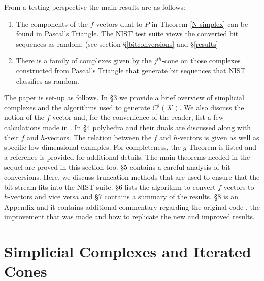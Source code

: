\documentclass[oneside,12pt]{amsart}
\theoremstyle{definition}
\numberwithin{equation}{section}
\begin{document}
From a testing perspective the main results are as follows: %

\begin{enumerate}
  \item The components of the $f$-vectors dual to $P$ in Theorem \ref{N simplex} can be found in Pascal's Triangle.  The NIST test suite views the converted bit sequences as random. (see section \S\ref{bitconversions} and \S\ref{results}\\[.5ex] %

  \item There is a family of complexes given by the $j^{th}$-cone on those complexes constructed from Pascal's Triangle that generate bit sequences that NIST classifies as random. %

\end{enumerate}

The paper is set-up as follows.  In \S 3 we provide a brief overview of simplicial complexes and the algorithms used to generate $C^j(\mathcal{K})$. We also discuss the notion of the $f$-vector and, for the convenience of the reader, list a few calculations made in \cite{ALDH}. In \S 4 polyhedra and their duals are discussed along with their $f$ and $h$-vectors. The relation between the $f$ and $h$-vectors is given as well as specific low dimensional examples. For completeness, the $g$-Theorem is listed and a reference is provided for additional details. The main theorems needed in the sequel are proved in this section too.  \S 5 contains a careful analysis of bit conversions.  Here, we discuss truncation methods that are used to ensure that the bit-stream fits into the NIST suite.  \S 6 lists the algorithm to convert $f$-vectors to $h$-vectors and vice versa and \S 7 contains a summary of the results. \S8 is an Appendix and it contains additional commentary regarding the original code \cite{ALDH}, the improvement that was made and how to replicate the new and improved results.

\section{Simplicial Complexes and Iterated Cones}
\end{document}
